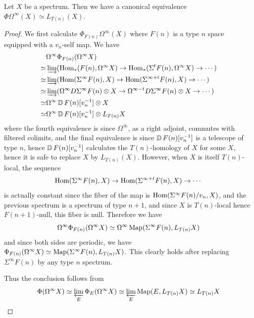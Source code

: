 	\begin{thm}\label{Bousfield_Kuhn_tel_loc_fac}
		Let $X$ be a spectrum. Then we have a canonical equivalence $\Phi\Omega^\infty(X)\simeq L_{T(n)}(X)$. 
	\end{thm}
	\begin{proof}
		We first calculate $\Phi_{F(n)}\Omega^\infty(X)$ where $F(n)$ is a type $n$ space equipped with a $v_n$-self map. We have 
		\begin{align*}
			&\Omega^\infty\Phi_{F(n)}(\Omega^\infty X) \\
			\simeq&\varinjlim(\operatorname{\mathrm{Hom}}_*(F(n),\Omega^\infty X)\to\operatorname{\mathrm{Hom}}_*(\Sigma^tF(n),\Omega^\infty X)\to\cdots) \\
			\simeq&\varinjlim(\operatorname{\mathrm{Hom}}(\Sigma^\infty F(n),X)\to\operatorname{\mathrm{Hom}}(\Sigma^{\infty+t}F(n),X)\to\cdots) \\
			\simeq&\varinjlim(\Omega^\infty D\Sigma^\infty F(n)\otimes X\to\Omega^{\infty-t}D\Sigma^\infty F(n)\otimes X\to\cdots) \\
			\simeq&\Omega^\infty \operatorname{\mathbb{D}} F(n)[v_n^{-1}]\otimes X \\
			\simeq&\Omega^\infty \operatorname{\mathbb{D}} F(n)[v_n^{-1}]\otimes L_{T(n)}X 
		\end{align*}
		where the fourth equivalence is since $\Omega^\infty$, as a right adjoint, commutes with filtered colimits, and the final equivalence is since $\operatorname{\mathbb{D}} F(n)[v_n^{-1}]$ is a telescope of type $n$, hence $\operatorname{\mathbb{D}} F(n)[v_n^{-1}]$ calculates the $T(n)$-homology of $X$ for some $X$, hence it is safe to replace $X$ by $L_{T(n)}(X)$. However, when $X$ is itself $T(n)$-local, the sequence 
		\[ \operatorname{\mathrm{Hom}}(\Sigma^\infty F(n),X)\to\operatorname{\mathrm{Hom}}(\Sigma^{\infty+t}F(n),X)\to\cdots \]
		is actually constant since the fiber of the map is $\operatorname{\mathrm{Hom}}(\Sigma^\infty F(n)/v_n,X)$, and the previous spectrum is a spectrum of type $n+1$, and since $X$ is $T(n)$-local hence $F(n+1)$-null, this fiber is null. Therefore we have 
		\[ \Omega^\infty\Phi_{F(n)}(\Omega^\infty X)\simeq\Omega^\infty\operatorname{\mathrm{Map}}(\Sigma^\infty F(n),L_{T(n)}X) \]
		and since both sides are periodic, we have $\Phi_{F(n)}(\Omega^\infty X)\simeq\operatorname{\mathrm{Map}}(\Sigma^\infty F(n),L_{T(n)}X)$. This clearly holds after replacing $\Sigma^\infty F(n)$ by any type $n$ spectrum. 

		Thus the conclusion follows from 
		\[ \Phi(\Omega^\infty X)\simeq\varprojlim_E\Phi_E(\Omega^\infty X)\simeq\varprojlim_E\operatorname{\mathrm{Map}}(E,L_{T(n)}X)\simeq L_{T(n)}X \]
	\end{proof}

